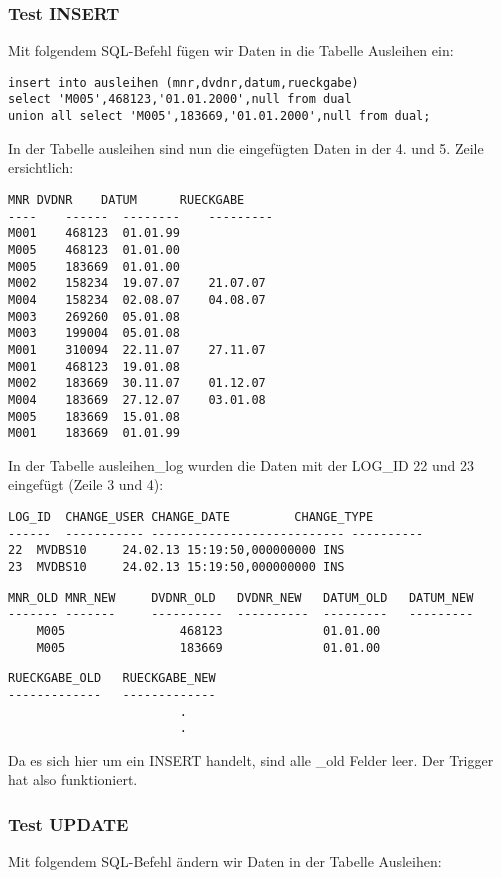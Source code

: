 \documentclass[11pt,a4paper,parskip=half]{scrartcl}
\begin{document}
\subsubsection{Test INSERT}

Mit folgendem SQL-Befehl fügen wir Daten in die Tabelle Ausleihen ein:

\begin{lstlisting}
insert into ausleihen (mnr,dvdnr,datum,rueckgabe) 
select 'M005',468123,'01.01.2000',null from dual
union all select 'M005',183669,'01.01.2000',null from dual;
\end{lstlisting}

In der Tabelle ausleihen sind nun die eingefügten Daten in der 4. und 5. Zeile ersichtlich:

\begin{lstlisting}
MNR	DVDNR	 DATUM		RUECKGABE
---- 	------	-------- 	---------
M001	468123 	01.01.99	
M005	468123	01.01.00	
M005	183669	01.01.00	
M002	158234 	19.07.07	21.07.07  
M004	158234 	02.08.07	04.08.07  
M003	269260 	05.01.08	
M003	199004 	05.01.08	
M001	310094 	22.11.07	27.11.07  
M001	468123 	19.01.08	
M002	183669 	30.11.07	01.12.07  
M004	183669 	27.12.07	03.01.08  
M005	183669 	15.01.08	
M001	183669	01.01.99	
\end{lstlisting}

In der Tabelle ausleihen\_log wurden die Daten mit der LOG\_ID 22 und 23 eingefügt (Zeile 3 und 4):

\begin{lstlisting}
LOG_ID	CHANGE_USER	CHANGE_DATE			CHANGE_TYPE	
------	-----------	---------------------------	----------		
22	MVDBS10		24.02.13 15:19:50,000000000	INS					
23	MVDBS10		24.02.13 15:19:50,000000000	INS					
\end{lstlisting}

\begin{lstlisting}
MNR_OLD	MNR_NEW		DVDNR_OLD	DVDNR_NEW	DATUM_OLD	DATUM_NEW	
-------	-------		----------	----------	---------	--------- 	
	M005				468123				01.01.00					
	M005				183669				01.01.00					
\end{lstlisting}
\begin{lstlisting}
RUECKGABE_OLD	RUECKGABE_NEW
-------------	-------------	
						.
						.
\end{lstlisting}

Da es sich hier um ein INSERT handelt, sind alle \_old Felder leer. Der Trigger hat also funktioniert.

\subsubsection{Test UPDATE}
Mit folgendem SQL-Befehl ändern wir Daten in der Tabelle Ausleihen:
\end{document}
